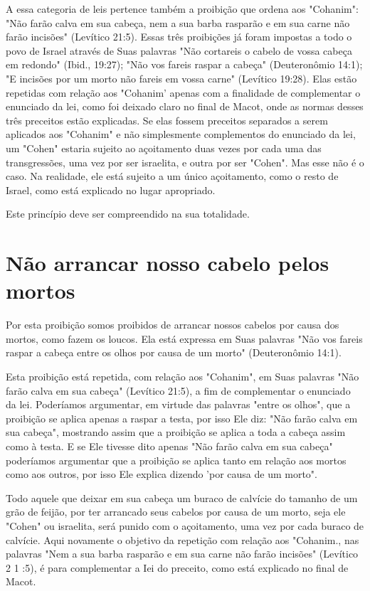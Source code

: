 \begin{itemize}
\begin{enumrate}
\begin{itemize}
\begin{itemize}
\begin{itemize}
A essa categoria de leis pertence também a proibição que ordena aos
"Cohanim": "Não farão calva em sua cabeça, nem a sua barba rasparão e em
sua carne não farão incisões" (Levítico 21:5). Essas três proibições já
foram im­postas a todo o povo de Israel através de Suas palavras "Não
cortareis o cabelo de vossa cabeça em redondo" (Ibid., 19:27); "Não vos
fareis raspar a cabeça" (Deuteronômio 14:1); "E incisões por um morto
não fareis em vossa carne" (Levítico 19:28). Elas estão repetidas com
relação aos "Cohanim' apenas com a finalidade de complementar o
enunciado da lei, como foi deixado claro no final de Macot, onde as
normas desses três preceitos estão explicadas. Se elas fossem preceitos
separados a serem aplicados aos "Cohanim" e não simples­mente
complementos do enunciado da lei, um "Cohen" estaria sujeito ao
açoi­tamento duas vezes por cada uma das transgressões, uma vez por ser
israelita, e outra por ser "Cohen". Mas esse não é o caso. Na realidade,
ele está sujeito a um único açoitamento, como o resto de Israel, como
está explicado no lugar apropriado.


Este princípio deve ser compreendido na sua totalidade.


\section{Não arrancar nosso cabelo pelos mortos}

Por esta proibição somos proibidos de arrancar nossos cabelos por causa
dos mortos, como fazem os loucos. Ela está expressa em Suas palavras
"Não vos fareis raspar a cabeça entre os olhos por causa de um morto"
(Deute­ronômio 14:1).

Esta proibição está repetida, com relação aos "Cohanim", em Suas
palavras "Não farão calva em sua cabeça" (Levítico 21:5), a fim de
complemen­tar o enunciado da lei. Poderíamos argumentar, em virtude das
palavras "entre os olhos", que a proibição se aplica apenas a raspar a
testa, por isso Ele diz: "Não farão calva em sua cabeça", mostrando
assim que a proibição se aplica a toda a cabeça assim como à testa. E se
Ele tivesse dito apenas "Não farão calva em sua cabeça" poderíamos
argumentar que a proibição se aplica tanto em re­lação aos mortos como
aos outros, por isso Ele explica dizendo 'por causa de um morto".

Todo aquele que deixar em sua cabeça um buraco de calvície do ta­manho
de um grão de feijão, por ter arrancado seus cabelos por causa de um
morto, seja ele "Cohen" ou israelita, será punido com o açoitamento, uma
vez por cada buraco de calvície. Aqui novamente
o objetivo da repetição com relação aos
"Cohanim., nas palavras "Nem a sua barba rasparão e em
sua carne não farão incisões" (Le­vítico 2 1 :5), é para complementar a
Iei do preceito, como está explicado no final de Macot.


\end{itemize}
\end{itemize}
\end{itemize}
\end{enumrate}
\end{itemize}
